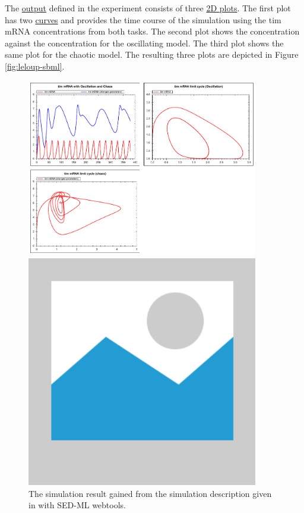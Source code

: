 The \hyperref[class:output]{output} defined in the experiment consists of three \hyperref[class:plot2D]{2D plots}. The first plot has two \hyperref[class:curve]{curves} and provides the time course of the simulation using the tim mRNA concentrations from both tasks. The second plot shows the  concentration against the  concentration for the oscillating model. The third plot shows the same plot for the chaotic model. The resulting three plots are depicted in Figure \ref{fig:leloup-sbml}. 


\begin{figure}[ht]
    \centering
    \begin{minipage}{0.45\textwidth}
        \centering
        \includegraphics[width=0.9\textwidth]{examples/leloup-sbml/results/leloup-sbml}
        \caption{The simulation result gained from the simulation description given in  with SED-ML webtools.}
    \end{minipage}\hfill
    \begin{minipage}{0.45\textwidth}
        \centering
        \includegraphics[width=0.9\textwidth]{examples/placeholder}

\end{minipage}
\end{figure}
